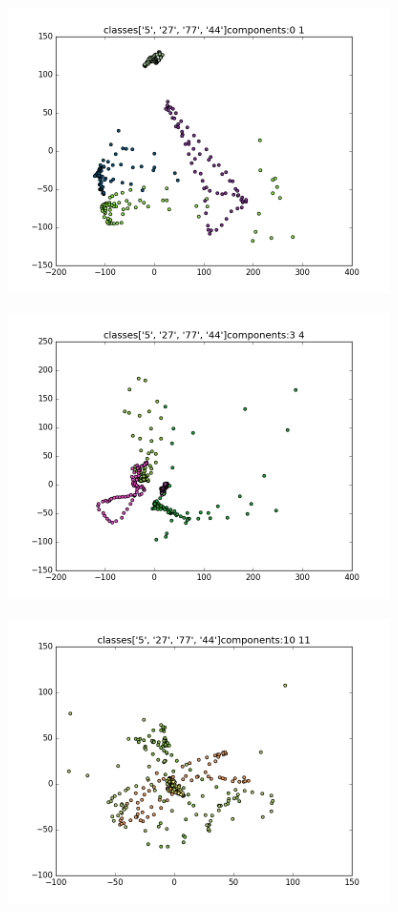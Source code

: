 \documentclass{article}
\begin{document}
					\begin{center}
\begin{figure}
\centering
\includegraphics[width=0.9\textwidth]{comp12color}
\caption{}
\label{fig:1}
\end{figure}
\begin{figure}
\centering
\includegraphics[width=0.9\textwidth]{comp34color}
\caption{}
\label{fig:2}
\end{figure}
\begin{figure}
\centering
\includegraphics[width=0.9\textwidth]{comp1011}
\caption{}
\label{fig:3}
\end{figure}
\end{center}
\end{document}
